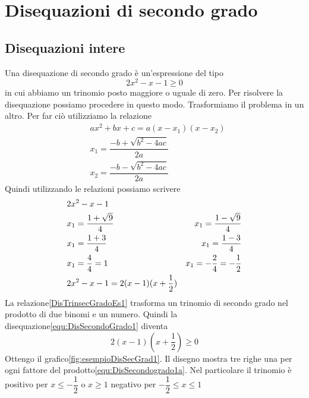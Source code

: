 \chapter{Disequazioni di secondo grado}
\label{cha:Disequazionisecondogrado}
\minitoc
\mtcskip                                %
\minilof                                %
\mtcskip                                %
\minilot
\section{Disequazioni intere}
Una disequazione di secondo grado è un'espressione del tipo
\begin{equation}
2x^2-x-1\geq 0\label{equ:DisSecondoGrado1}
\end{equation} 
in cui abbiamo un trinomio posto maggiore o uguale di zero. Per risolvere la disequazione  possiamo procedere in questo modo. Trasformiamo  il problema in un altro. Per far ciò  utilizziamo la relazione
\begin{align}
&ax^2+bx+c=a(x-x_{1})(x-x_{2})\label{DisTrinsecGrado0}\\
&x_{1}=\dfrac{-b+\sqrt{b^2-4ac}}{2a}\label{DisTrinsecGrado1}\\
&x_{2}=\dfrac{-b-\sqrt{b^2-4ac}}{2a}\label{DisTrinsecGrado2}
\end{align}
Quindi utilizzando le relazioni\nobs{} possiamo scrivere 
\begin{align}
&2x^2-x-1\\
&x_{1}=\dfrac{1+\sqrt{9}}{4}\notag
&x_{1}=\dfrac{1-\sqrt{9}}{4}\notag\\
&x_{1}=\dfrac{1+3}{4}\notag
&x_{1}=\dfrac{1-3}{4}\notag\\
&x_{1}=\dfrac{4}{4}=1\notag
&x_{1}=-\dfrac{2}{4}=-\dfrac{1}{2}\notag\\
&2x^2-x-1=2(x-1)(x+\dfrac{1}{2})\label{DisTrinsecGradoEs1}
\end{align}
La relazione\nobs\vref{DisTrinsecGradoEs1} trasforma un trinomio di secondo grado nel prodotto di due binomi e un numero. Quindi la disequazione\nobs\vref{equ:DisSecondoGrado1} diventa 
\begin{equation}
2(x-1)(x+\dfrac{1}{2})\geq 0\label{equ:DisSecondogrado1a}
\end{equation} 
Ottengo il grafico\nobs\vref{fig:esempioDisSecGrad1}. Il disegno mostra tre righe una per ogni fattore del prodotto\nobs\vref{equ:DisSecondogrado1a}. Nel particolare il trinomio è positivo per $x\leq-\dfrac{1}{2}$ o $x\geq 1$ negativo per $-\dfrac{1}{2}\leq x\leq 1$

